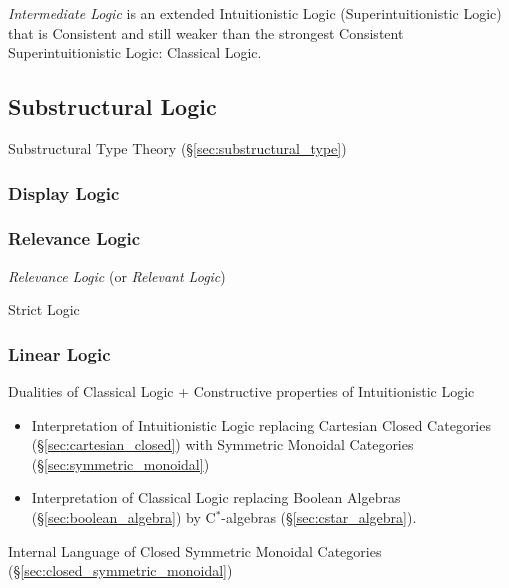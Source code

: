 \emph{Intermediate Logic} is an extended Intuitionistic Logic
(Superintuitionistic Logic) that is Consistent and still weaker than
the strongest Consistent Superintuitionistic Logic: Classical Logic.



\subsection{Substructural Logic}\label{sec:substructural_logic}

Substructural Type Theory (\S\ref{sec:substructural_type})



\subsubsection{Display Logic}\label{sec:display_logic}

\subsubsection{Relevance Logic}\label{sec:relevance_logic}

\emph{Relevance Logic} (or \emph{Relevant Logic})

Strict Logic



\subsubsection{Linear Logic}\label{sec:linear_logic}

Dualities of Classical Logic + Constructive properties of
Intuitionistic Logic

\begin{itemize}
\item Interpretation of Intuitionistic Logic replacing Cartesian Closed
  Categories (\S\ref{sec:cartesian_closed}) with Symmetric Monoidal
  Categories (\S\ref{sec:symmetric_monoidal})
\item Interpretation of Classical Logic replacing Boolean Algebras
  (\S\ref{sec:boolean_algebra}) by C$^*$-algebras
  (\S\ref{sec:cstar_algebra}).
\end{itemize}

Internal Language of Closed Symmetric Monoidal Categories
(\S\ref{sec:closed_symmetric_monoidal})

